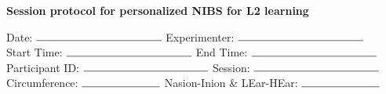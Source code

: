 \documentclass[journal, onecolumn, 12pt]{IEEEtran}
\title{}
\begin{document}
	
	
	
	\begin{center}
		{ \Large  
			\textbf{Session protocol for personalized NIBS for L2 learning}
		}
	\end{center}
	
\vspace{.5cm}

\hspace{1cm} Date:   \hspace{1.4cm}  $\rule{4cm}{0.15mm}$ \hfill Experimenter: $\rule{4cm}{0.15mm}$ \hspace{1cm} \\ 


\hspace{1cm} Start Time: \hspace{.45cm}  $\rule{4cm}{0.15mm}$ \hfill End Time:  \hspace{.45cm} $\rule{4cm}{0.15mm}$ \hspace{1cm} \\ 

\hspace{1cm} Participant ID:  $\rule{4cm}{0.15mm}$ \hfill Session:  \hspace{.85cm} $\rule{4cm}{0.15mm}$ \hspace{1cm} \\ 

\hspace{1cm} Circumference:  $\rule{2.5cm}{0.15mm}$ \hfill Nasion-Inion \& LEar-HEar:  \hspace{.85cm} $\rule{2.5cm}{0.15mm}$ \hspace{1cm} \\ 
\end{document}
